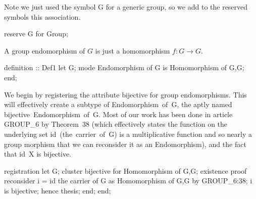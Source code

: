 \nwendcode{}\nwdocspar

\M Note we just used the symbol {\Tt{}G\nwendquote} for a generic group, so we add to
the reserved symbols this association.

\nwenddocs{}\endmoddef\nwstartdeflinemarkup{}\nwenddeflinemarkup
reserve G for Group;

\nwendcode{}\nwdocspar

\M A group endomorphism of $G$ is just a homomorphism $f\colon G\to G$.

\nwenddocs{}\endmoddef\nwstartdeflinemarkup{}\nwenddeflinemarkup
definition :: Def1
  let G;
  mode Endomorphism of G is Homomorphism of G,G;
end;

\nwendcode{}\nwdocspar

\M\label{par:characteristic:register-bijective-for-endomorphism}
We begin by registering the attribute {\Tt{}bijective\nwendquote} for group
endomorphisms. This will effectively create a subtype of
{\Tt{}Endomorphism\ of\ G\nwendquote}, the aptly named {\Tt{}bijective\ Endomorphism\ of\ G\nwendquote}.
Most of our work has been done in article {\Tt{}GROUP{\_}6\nwendquote} by
Theorem~38 (which effectively states the function on the underlying set
{\Tt{}id\ (the\ carrier\ of\ G)\nwendquote} is a multiplicative function and so nearly a
group morphism that we can reconsider it as an {\Tt{}Endomorphism\nwendquote}), and
the fact that {\Tt{}id\ X\nwendquote} is bijective.

\nwenddocs{}\endmoddef\nwstartdeflinemarkup{}\nwenddeflinemarkup
registration
  let G;
  cluster bijective for Homomorphism of G,G;
  existence
  proof
    reconsider i = id the carrier of G as Homomorphism of G,G by GROUP_6:38;
    i is bijective;
    hence thesis;
  end;
end;

